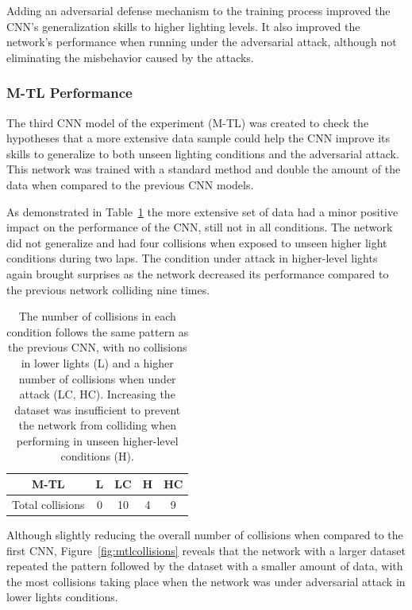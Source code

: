 \documentclass[12pt]{article}
\begin{document}
Adding an adversarial defense mechanism to the training process improved the CNN's generalization skills to higher lighting levels. It also improved the network's performance when running under the adversarial attack, although not eliminating the misbehavior caused by the attacks. 

\subsubsection{M-TL Performance}

The third CNN model of the experiment (M-TL) was created to check the hypotheses that a more extensive data sample could help the CNN improve its skills to generalize to both unseen lighting conditions and the adversarial attack. This network was trained with a standard method and double the amount of the data when compared to the previous CNN models. 

As demonstrated in Table~\ref{tab:mtl} the more extensive set of data had a minor positive impact on the performance of the CNN, still not in all conditions. The network did not generalize and had four collisions when exposed to unseen higher light conditions during two laps. The condition under attack in higher-level lights again brought surprises as the network decreased its performance compared to the previous network colliding nine times. 

\begin{table}[H]
\begin{center}
\begin{tabular}{ |c|c|c|c|c| } 
\hline
M-TL & L & LC & H & HC \\
\hline
Total collisions & 0 & 10 & 4 & 9 \\
\hline
\end{tabular}
\caption{\label{tab:mtl}The number of collisions in each condition follows the same pattern as the previous CNN, with no collisions in lower lights (L) and a higher number of collisions when under attack (LC, HC). Increasing the dataset was insufficient to prevent the network from colliding when performing in unseen higher-level conditions (H).}
\end{center}
\end{table}

Although slightly reducing the overall number of collisions when compared to the first CNN, Figure~\ref{fig:mtlcollisions} reveals that the network with a larger dataset repeated the pattern followed by the dataset with a smaller amount of data, with the most collisions taking place when the network was under adversarial attack in lower lights conditions. 
\end{document}
